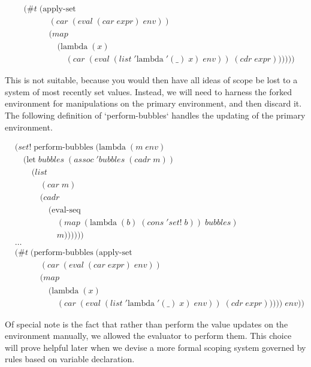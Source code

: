 \begin{align*}
& (\#t \; (\text{apply-set} \; 
\\& \qquad \quad (car \; (eval \; (car \; expr) \; env))
\\& \qquad \quad (map \; 
\\& \qquad \qquad (\text{lambda} \; (x) \; 
\\& \qquad \qquad \quad (car \; (eval \; (list \; '\text{lambda} \; '(\_) \; x) \; env)) \; (cdr \; expr))))))
\end{align*}

This is not suitable, because you would then have all ideas of scope be lost
to a system of most recently set values. Instead, we will need to harness the
forked environment for manipulations on the primary environment, and then
discard it. The following definition of `perform-bubbles` handles the 
updating of the primary environment.

\begin{align*}
& (set! \; \text{perform-bubbles} \; (\text{lambda} \; (m \; env)
\\& \quad (\text{let} \; bubbles \; (assoc \; 'bubbles \; (cadr \; m))
\\& \qquad (list
\\& \qquad \quad (car \; m)
\\& \qquad \quad (cadr \; 
\\& \qquad \qquad (\text{eval-seq}
\\& \qquad \qquad \quad (map \; (\text{lambda} \; (b) \; (cons \; 'set! \; b)) \; bubbles)
\\& \qquad \qquad \quad m))))))
\\& \dots
\\& (\#t \; (\text{perform-bubbles} \; (\text{apply-set} \; 
\\& \qquad \quad (car \; (eval \; (car \; expr) \; env))
\\& \qquad \quad (map \; 
\\& \qquad \qquad (\text{lambda} \; (x) \; 
\\& \qquad \qquad \quad (car \; (eval \; (list \; '\text{lambda} \; '(\_) \; x) \; env)) \; (cdr \; expr))))) \; env))
\end{align*}

Of special note is the fact that rather than perform the value updates on the
environment manually, we allowed the evaluator to perform them. This choice
will prove helpful later when we devise a more formal scoping system governed
by rules based on variable declaration.

